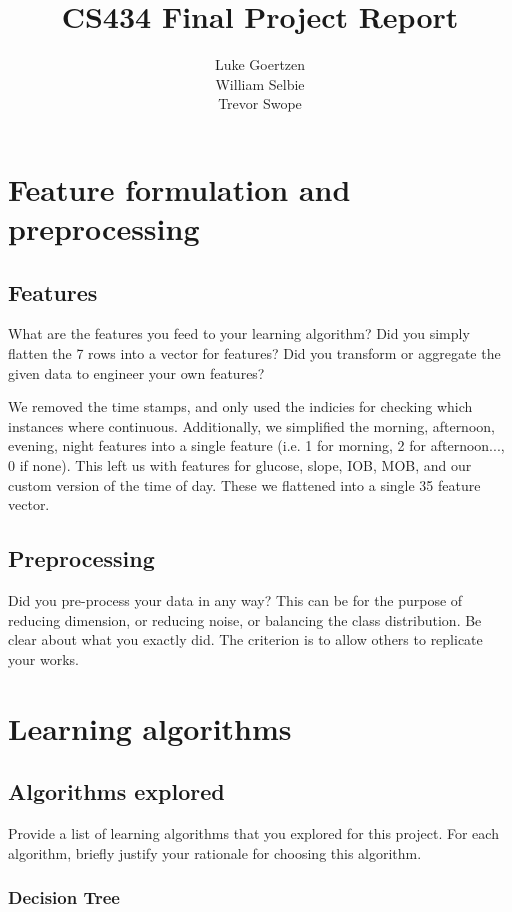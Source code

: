 \documentclass[11pt,a4paper]{article}
\title{CS434 Final Project Report}
\author{Luke Goertzen \\ William Selbie \\ Trevor Swope}
\date{}
\begin{document}
\maketitle

\section{Feature formulation and preprocessing}

\subsection{Features} 
What are the features you feed to your learning algorithm? Did you simply flatten the 7 rows into a vector for features? Did you transform or aggregate the given data to engineer your own features?

We removed the time stamps, and only used the indicies for checking which instances where continuous. Additionally, we simplified the morning, afternoon, evening, night features into a single feature (i.e. 1 for morning, 2 for afternoon..., 0 if none). This left us with features for  glucose, slope, IOB, MOB, and our custom version of the time of day. These we flattened into a single 35 feature vector.


\subsection{Preprocessing}

Did you pre-process your data in any way? This can be for the purpose of reducing dimension, or reducing noise, or balancing the class distribution. Be clear about what you exactly did. The criterion is to allow others to replicate your works.



\section{Learning algorithms}

\subsection{Algorithms explored}
Provide a list of learning algorithms that you explored for this project. For each algorithm, briefly justify your rationale for choosing this algorithm.

\subsubsection{Decision Tree}
\end{document}
